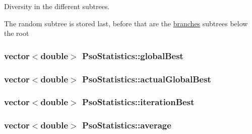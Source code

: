 Diversity in the different subtrees. 

The random subtree is stored last, before that are the \hyperlink{runpso_8cpp_862f1f1b7a79e1acd3a882c444a7fa62}{branches} subtrees below the root \hypertarget{classPsoStatistics_d722cb30c693021e23678f7ea04e59cb}{
\subsubsection{\setlength{\rightskip}{0pt plus 5cm}vector$<$double$>$ {\bf PsoStatistics::globalBest}}}
\label{classPsoStatistics_d722cb30c693021e23678f7ea04e59cb}


\hypertarget{classPsoStatistics_eed25ec71564e096eaacad2fbf0dc5cc}{
\subsubsection{\setlength{\rightskip}{0pt plus 5cm}vector$<$double$>$ {\bf PsoStatistics::actualGlobalBest}}}
\label{classPsoStatistics_eed25ec71564e096eaacad2fbf0dc5cc}


\hypertarget{classPsoStatistics_aaf855c6f7fbf4fc3e2f297d3b047541}{
\subsubsection{\setlength{\rightskip}{0pt plus 5cm}vector$<$double$>$ {\bf PsoStatistics::iterationBest}}}
\label{classPsoStatistics_aaf855c6f7fbf4fc3e2f297d3b047541}


\hypertarget{classPsoStatistics_916e5a0000c614dc4e29a59f83f0fba8}{
\subsubsection{\setlength{\rightskip}{0pt plus 5cm}vector$<$double$>$ {\bf PsoStatistics::average}}}
\label{classPsoStatistics_916e5a0000c614dc4e29a59f83f0fba8}


